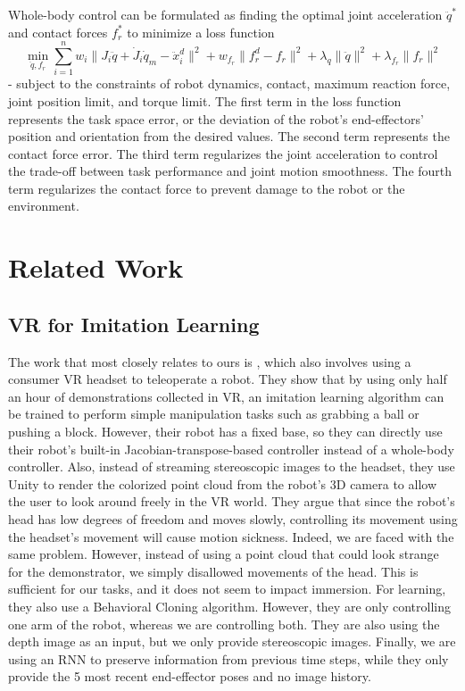 Whole-body control can be formulated as finding the optimal joint acceleration $\ddot{q}^*$ and contact forces $f_r^*$ to minimize a loss function 
$$
\min_{\ddot{q}, f_r}
 \sum_{i=1}^{n} 
  w_i \|J_i\ddot{q} 
   +\dot{J}_i\dot{q}_m
   -\ddot{x}_i^d\|^2
  +w_{f_r} \| f_r^d - f_r\|^2
  +\lambda_q \|\ddot{q}\|^2
  +\lambda_{f_r} \|f_r\|^2
$$
- subject to the constraints of robot dynamics, contact, maximum reaction force, joint position limit, and torque limit.
The first term in the loss function represents the task space error, or the deviation of the robot's end-effectors' position and orientation from the desired values. The second term represents the contact force error. The third term regularizes the joint acceleration to control the trade-off between task performance and joint motion smoothness. The fourth term regularizes the contact force to prevent damage to the robot or the environment.

\section{Related Work}

\subsection{VR for Imitation Learning}

The work that most closely relates to ours is \cite{zhang2018deep}, which also involves using a consumer VR headset to teleoperate a robot. They show that by using only half an hour of demonstrations collected in VR, an imitation learning algorithm can be trained to perform simple manipulation tasks such as grabbing a ball or pushing a block. 
However, their robot has a fixed base, so they can directly use their robot's built-in Jacobian-transpose-based controller instead of a whole-body controller. 
Also, instead of streaming stereoscopic images to the headset, they use Unity to render the colorized point cloud from the robot's 3D camera to allow the user to look around freely in the VR world. 
They argue that since the robot's head has low degrees of freedom and moves slowly, controlling its movement using the headset's movement will cause motion sickness. 
Indeed, we are faced with the same problem. 
However, instead of using a point cloud that could look strange for the demonstrator, we simply disallowed movements of the head.
This is sufficient for our tasks, and it does not seem to impact immersion. 
For learning, they also use a Behavioral Cloning algorithm. 
However, they are only controlling one arm of the robot, whereas we are controlling both. 
They are also using the depth image as an input, but we only provide stereoscopic images. 
Finally, we are using an RNN to preserve information from previous time steps, while they only provide the 5 most recent end-effector poses and no image history. 

